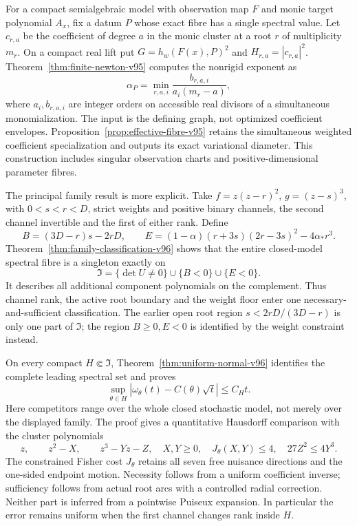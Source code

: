 For a compact semialgebraic model with observation map $F$ and monic
target polynomial $A_x$, fix a datum $P$ whose exact fibre has a single
spectral value. Let $c_{r,a}$ be the coefficient of degree $a$ in the
monic cluster at a root $r$ of multiplicity $m_r$. On a compact real
lift put $G=h_w(F(x),P)^2$ and $H_{r,a}=|c_{r,a}|^2$.
Theorem~\ref{thm:finite-newton-v95} computes the nonrigid exponent as
\[
 \alpha_P=\min_{r,a,i}\frac{b_{r,a,i}}{a_i(m_r-a)},
\]
where $a_i,b_{r,a,i}$ are integer orders on accessible real divisors
of a simultaneous monomialization. The input is the defining graph,
not optimized coefficient envelopes. Proposition~\ref{prop:effective-fibre-v95}
retains the simultaneous weighted coefficient specialization and
outputs its exact variational diameter. This construction includes
singular observation charts and positive-dimensional parameter fibres.

The principal family result is more explicit. Take
$f=z(z-r)^2$, $g=(z-s)^3$, with $0<s<r<D$, strict weights and positive
binary channels, the second channel invertible and the first of either
rank. Define
\[
 B=(3D-r)s-2rD,\qquad
 E=(1-\alpha)(r+3s)(2r-3s)^2-4\alpha_*r^3.
\]
Theorem~\ref{thm:family-classification-v96} shows that the entire
closed-model spectral fibre is a singleton exactly on
\[
 \mathfrak I=\{\det U\ne0\}\cup\{B<0\}\cup\{E<0\}.
\]
It describes all additional component polynomials on the complement.
Thus channel rank, the active root boundary and the weight floor enter
one necessary-and-sufficient classification. The earlier open root
region $s<2rD/(3D-r)$ is only one part of $\mathfrak I$; the region
$B\ge0,E<0$ is identified by the weight constraint instead.

On every compact $H\Subset\mathfrak I$, Theorem~\ref{thm:uniform-normal-v96}
identifies the complete leading spectral set and proves
\[
 \sup_{\theta\in H}
  |\omega_\theta(t)-C(\theta)\sqrt t|\le C_Ht.
\]
Here competitors range over the whole closed stochastic model, not
merely over the displayed family. The proof gives a quantitative
Hausdorff comparison with the cluster polynomials
\[
 z,\qquad z^2-X,\qquad z^3-Yz-Z,
 \quad X,Y\ge0,\quad J_\theta(X,Y)\le4,\quad27Z^2\le4Y^3.
\]
The constrained Fisher cost $J_\theta$ retains all seven free nuisance
directions and the one-sided endpoint motion. Necessity follows from
a uniform coefficient inverse; sufficiency follows from actual root
arcs with a controlled radial correction. Neither part is inferred
from a pointwise Puiseux expansion. In particular the error remains
uniform when the first channel changes rank inside $H$.

